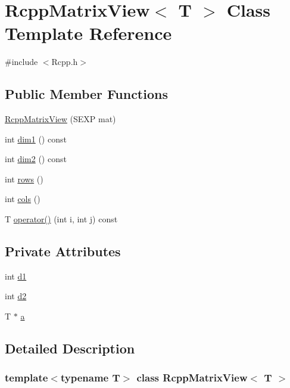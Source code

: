 \hypertarget{classRcppMatrixView}{
\section{RcppMatrixView$<$ T $>$ Class Template Reference}
\label{classRcppMatrixView}
}


{\ttfamily \#include $<$Rcpp.h$>$}\subsection*{Public Member Functions}
\begin{DoxyCompactItemize}
\item 
\hyperlink{classRcppMatrixView_ac3489c6a24c2975f3ea7103ada50e328}{RcppMatrixView} (SEXP mat)
\item 
int \hyperlink{classRcppMatrixView_a72d1d7fcdc4b1cc6dd877b1df2f9f5e6}{dim1} () const 
\item 
int \hyperlink{classRcppMatrixView_aebb7f65646ce780c897dc39f31899439}{dim2} () const 
\item 
int \hyperlink{classRcppMatrixView_a0892184e9fc01863f79d76b3751ddbdb}{rows} ()
\item 
int \hyperlink{classRcppMatrixView_a037e6fee7e029eef53c35a63f11e2e2a}{cols} ()
\item 
T \hyperlink{classRcppMatrixView_ad135a7e855eee55b078807766aff9e96}{operator()} (int i, int j) const 
\end{DoxyCompactItemize}
\subsection*{Private Attributes}
\begin{DoxyCompactItemize}
\item 
int \hyperlink{classRcppMatrixView_ad492401691ef709f6d2ef7dc1dcc2134}{d1}
\item 
int \hyperlink{classRcppMatrixView_a37b5f5806957eeb0b688d6a157a2a264}{d2}
\item 
T $\ast$ \hyperlink{classRcppMatrixView_ad38481118f63a84a132e8f2265de5bdd}{a}
\end{DoxyCompactItemize}


\subsection{Detailed Description}
\subsubsection*{template$<$typename T$>$ class RcppMatrixView$<$ T $>$}




